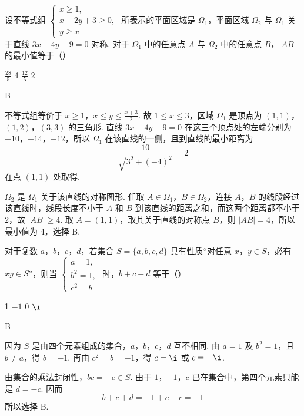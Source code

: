 \begin{problem}
设不等式组 \(\begin{cases}
x \geqslant 1,\\
x - 2y + 3 \geqslant 0,\\
y \geqslant x
\end{cases}\) 所表示的平面区域是 \(\Omega_1\)，平面区域 \(\Omega_2\) 与 \(\Omega_1\) 关于直线 \(3x - 4y - 9 = 0\) 对称. 对于 \(\Omega_1\) 中的任意点 \(A\) 与 \(\Omega_2\) 中的任意点 \(B\)，\(|AB|\) 的最小值等于（\quad）

\choices
    {\(\frac{28}{5}\)}
    {4}
    {\(\frac{12}{5}\)}
    {2}
\end{problem}

\begin{answer}
B
\end{answer}

\begin{solution}
不等式组等价于
\(x\geqslant1\)，\(x\leqslant y\leqslant\frac{x+3}{2}\).
故 \(1\leqslant x\leqslant3\)，区域 \(\Omega_{1}\) 是顶点为 \((1,1)\)，\((1,2)\)，\((3,3)\) 的三角形. 直线 \(3x-4y-9=0\) 在这三个顶点处的左端分别为 \(-10\)，\(-14\)，\(-12\)，所以 \(\Omega_{1}\) 在该直线的一侧，且到直线的最小距离为
\[
\frac{10}{\sqrt{3^{2}+(-4)^{2}}}=2
\]
在点 \((1,1)\) 处取得.

\(\Omega_{2}\) 是 \(\Omega_{1}\) 关于该直线的对称图形. 任取 \(A\in\Omega_{1}\)，\(B\in\Omega_{2}\)，连接 \(A\)，\(B\) 的线段经过该直线时，线段长度不小于 \(A\) 和 \(B\) 到该直线的距离之和，而这两个距离都不小于 \(2\)，故 \(|AB|\geqslant4\). 取 \(A=(1,1)\)，取其关于直线的对称点 \(B\)，则 \(|AB|=4\)，所以最小值为 \(4\)，选择 B.
\end{solution}

\begin{problem}
对于复数 \(a\)，\(b\)，\(c\)，\(d\)，若集合 \(S = \{a, b, c, d\}\) 具有性质“对任意 \(x\)，\(y \in S\)，必有 \(xy \in S\)”，则当 \(\begin{cases}
a = 1,\\
b^2 = 1,\\
c^2 = b
\end{cases}\) 时，\(b + c + d\) 等于（\quad）

\choices
    {1}
    {\(-1\)}
    {0}
    {\(\i\)}
\end{problem}

\begin{answer}
B
\end{answer}

\begin{solution}
因为 \(S\) 是由四个元素组成的集合，\(a\)，\(b\)，\(c\)，\(d\) 互不相同. 由 \(a=1\) 及 \(b^{2}=1\)，且 \(b\neq a\)，得 \(b=-1\). 再由 \(c^{2}=b=-1\)，得 \(c=\i\) 或 \(c=-\i\).

由集合的乘法封闭性，\(bc=-c\in S\). 由于 \(1\)，\(-1\)，\(c\) 已在集合中，第四个元素只能是 \(d=-c\). 因而
\[
b+c+d=-1+c-c=-1
\]
所以选择 B.
\end{solution}

